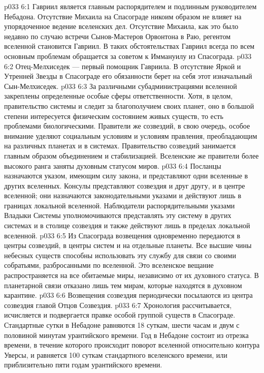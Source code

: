 \vs p033 6:1 Гавриил является главным распорядителем и подлинным руководителем Небадона. Отсутствие Михаила на Спасограде никоим образом не влияет на упорядоченное ведение вселенских дел. Отсутствие Михаила, как это было недавно по случаю встречи Сынов\hyp{}Мастеров Орвонтона в Раю, регентом вселенной становится Гавриил. В таких обстоятельствах Гавриил всегда по всем основным проблемам обращается за советом к Иммануилу из Спасограда.
\vs p033 6:2 Отец\hyp{}Мелхиседек --- первый помощник Гавриила. В отсутствие Яркой и Утренней Звезды в Спасограде его обязанности берет на себя этот изначальный Сын\hyp{}Мелхиседек.
\vs p033 6:3 \pc За различными субадминистрациями вселенной закреплены определенные особые сферы ответственности. Хотя, в целом, правительство системы и следит за благополучием своих планет, оно в большой степени интересуется физическим состоянием живых существ, то есть проблемами биологическими. Правители же созвездий, в свою очередь, особое внимание уделяют социальным условиям и условиям правления, преобладающим на различных планетах и в системах. Правительство созвездий занимается главным образом объединением и стабилизацией. Вселенские же правители более высокого ранга заняты духовным статусом миров.
\vs p033 6:4 \pc Посланцы назначаются указом, имеющим силу закона, и представляют одни вселенные в других вселенных. Консулы представляют созвездия и друг другу, и в центре вселенной; они назначаются законодательными указами и действуют лишь в границах локальной вселенной. Наблюдатели распорядительными указами Владыки Системы уполномочиваются представлять эту систему в других системах и в столице созвездия и также действуют лишь в пределах локальной вселенной.
\vs p033 6:5 \pc Из Спасограда возвещения одновременно передаются в центры созвездий, в центры систем и на отдельные планеты. Все высшие чины небесных существ способны использовать эту службу для связи со своими собратьями, разбросанными по вселенной. Это вселенское вещание распространяется на все обитаемые миры, независимо от их духовного статуса. В планетарной связи отказано лишь тем мирам, которые находятся в духовном карантине.
\vs p033 6:6 Возвещения созвездия периодически посылаются из центра созвездия главой Отцов Созвездия.
\vs p033 6:7 \pc Хронология рассчитывается, исчисляется и подвергается правке особой группой существ в Спасограде. Стандартные сутки в Небадоне равняются 18 суткам, шести часам и двум с половиной минутам урантийского времени. Год в Небадоне состоит из отрезка времени, в течение которого происходит поворот вселенной относительно контура Уверсы, и равняется 100 суткам стандартного вселенского времени, или приблизительно пяти годам урантийского времени.
